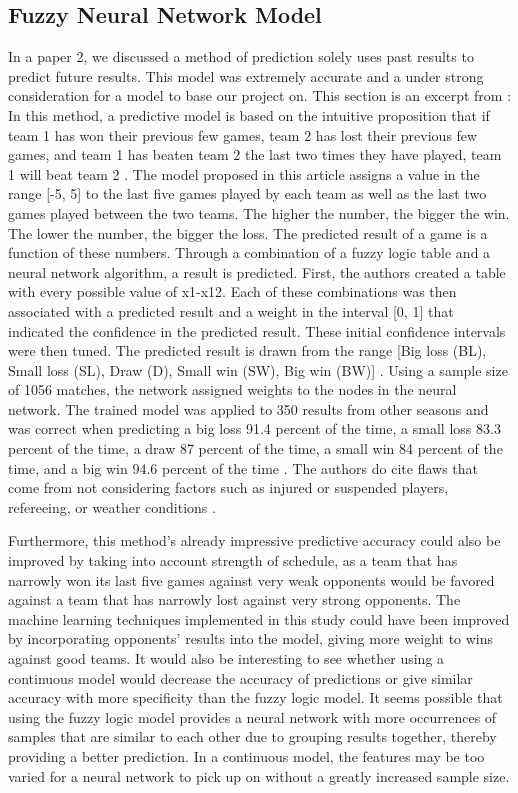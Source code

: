 \documentclass[sigconf]{acmart}
\begin{document}
\subsection{Fuzzy Neural Network Model}
In a paper 2, we discussed a method of prediction solely uses past results to predict future results. This model was extremely accurate and a under strong consideration for a model to base our project on. This section is an excerpt from \cite{paper2}:  In this method, a predictive model is based on the intuitive proposition that if team 1 has won their previous few games, team 2 has lost their previous few games, and team 1 has beaten team 2 the last two times they have played, team 1 will beat team 2 \cite{FuzzyModel}. The model proposed in this article assigns a value in the range [-5, 5] to the last five games played by each team as well as the last two games played between the two teams. The higher the number, the bigger the win. The lower the number, the bigger the loss. The predicted result of a game is a function of these numbers. Through a combination of a fuzzy logic table and a neural network algorithm, a result is predicted. First, the authors created a table with every possible value of x1-x12. Each of these combinations was then associated with a predicted result and a weight in the interval [0, 1] that indicated the confidence in the predicted result. These initial confidence intervals were then tuned. The predicted result is drawn from the range [Big loss (BL), Small loss (SL), Draw (D), Small win (SW), Big win (BW)] \cite{FuzzyModel}. Using a sample size of 1056 matches, the network assigned weights to the nodes in the neural network. The trained model was applied to 350 results from other seasons and was correct when predicting a big loss 91.4 percent of the time, a small loss 83.3 percent of the time, a draw 87 percent of the time, a small win 84 percent of the time, and a big win 94.6 percent of the time \cite{FuzzyModel}. The authors do cite flaws that come from not considering factors such as injured or suspended players, refereeing, or weather conditions \cite{FuzzyModel}. \cite{paper2}

Furthermore, this method's already impressive predictive accuracy could also be improved by taking into account strength of schedule, as a team that has narrowly won its last five games against very weak opponents would be favored against a team that has narrowly lost against very strong opponents. The machine learning techniques implemented in this study could have been improved by incorporating opponents' results into the model, giving more weight to wins against good teams. \cite{paper2} It would also be interesting to see whether using a continuous model would decrease the accuracy of predictions or give similar accuracy with more specificity than the fuzzy logic model. It seems possible that using the fuzzy logic model provides a neural network with more occurrences of samples that are similar to each other due to grouping results together, thereby providing a better prediction. In a continuous model, the features may be too varied for a neural network to pick up on without a greatly increased sample size.
\end{document}
